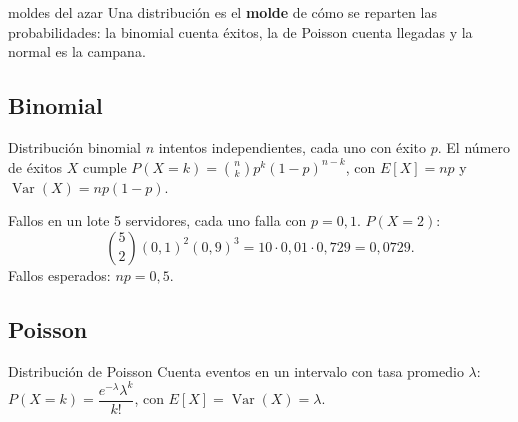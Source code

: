 \begin{tmconcepto}{moldes del azar}
Una distribuci\'on es el \textbf{molde} de c\'omo se reparten las probabilidades: la binomial cuenta \'exitos, la de Poisson cuenta llegadas y la normal es la campana.
\end{tmconcepto}


\subsection{Binomial}
\begin{tmdef}{Distribuci\'on binomial}
$n$ intentos independientes, cada uno con \'exito $p$. El n\'umero de \'exitos $X$ cumple $P(X=k)=\binom nk p^k(1-p)^{n-k}$, con $E[X]=np$ y $\operatorname{Var}(X)=np(1-p)$.
\end{tmdef}

\begin{tmejemplo}{Fallos en un lote}
5 servidores, cada uno falla con $p=0{,}1$. $P(X=2)$:
\[\binom52(0{,}1)^2(0{,}9)^3=10\cdot0{,}01\cdot0{,}729=0{,}0729.\]
Fallos esperados: $np=0{,}5$.
\end{tmejemplo}

\begin{center}
\end{center}

\subsection{Poisson}
\begin{tmdef}{Distribuci\'on de Poisson}
Cuenta eventos en un intervalo con tasa promedio $\lambda$: $P(X=k)=\dfrac{e^{-\lambda}\lambda^k}{k!}$, con $E[X]=\operatorname{Var}(X)=\lambda$.
\end{tmdef}

